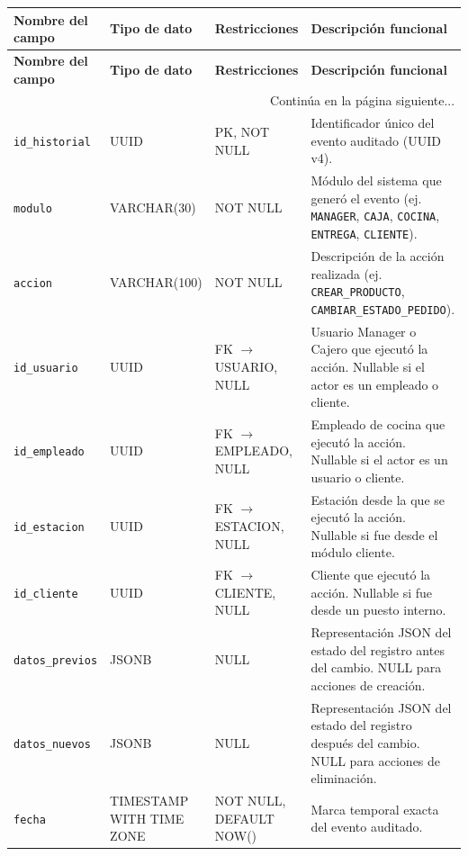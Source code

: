 \begin{tabularx}{\textwidth}{l p{2.5cm} p{3.5cm} X}
\caption{Tabla HISTORIAL\_DE\_MOVIMIENTOS de la base de datos} \label{tab:historial-de-movimientos}\\
\toprule
\textbf{Nombre del campo} & \textbf{Tipo de dato} & \textbf{Restricciones} & \textbf{Descripción funcional} \\
\midrule
\endfirsthead

\toprule
\textbf{Nombre del campo} & \textbf{Tipo de dato} & \textbf{Restricciones} & \textbf{Descripción funcional} \\
\midrule
\endhead

\midrule
\multicolumn{4}{r}{\small Continúa en la página siguiente...} \\
\endfoot
\bottomrule
\endlastfoot

\texttt{id\_historial} & UUID & PK, NOT NULL & Identificador único del evento auditado (UUID v4). \\
\addlinespace
\texttt{modulo} & VARCHAR(30) & NOT NULL & Módulo del sistema que generó el evento (ej. \texttt{MANAGER}, \texttt{CAJA}, \texttt{COCINA}, \texttt{ENTREGA}, \texttt{CLIENTE}). \\
\addlinespace
\texttt{accion} & VARCHAR(100) & NOT NULL & Descripción de la acción realizada (ej. \texttt{CREAR\_PRODUCTO}, \texttt{CAMBIAR\_ESTADO\_PEDIDO}). \\
\addlinespace
\texttt{id\_usuario} & UUID & FK $\rightarrow$ USUARIO, NULL & Usuario Manager o Cajero que ejecutó la acción. Nullable si el actor es un empleado o cliente. \\
\addlinespace
\texttt{id\_empleado} & UUID & FK $\rightarrow$ EMPLEADO, NULL & Empleado de cocina que ejecutó la acción. Nullable si el actor es un usuario o cliente. \\
\addlinespace
\texttt{id\_estacion} & UUID & FK $\rightarrow$ ESTACION, NULL & Estación desde la que se ejecutó la acción. Nullable si fue desde el módulo cliente. \\
\addlinespace
\texttt{id\_cliente} & UUID & FK $\rightarrow$ CLIENTE, NULL & Cliente que ejecutó la acción. Nullable si fue desde un puesto interno. \\
\addlinespace
\texttt{datos\_previos} & JSONB & NULL & Representación JSON del estado del registro antes del cambio. NULL para acciones de creación. \\
\addlinespace
\texttt{datos\_nuevos} & JSONB & NULL & Representación JSON del estado del registro después del cambio. NULL para acciones de eliminación. \\
\addlinespace
\texttt{fecha} & TIMESTAMP WITH TIME ZONE & NOT NULL, DEFAULT NOW() & Marca temporal exacta del evento auditado. \\
\end{tabularx}
\endgroup

